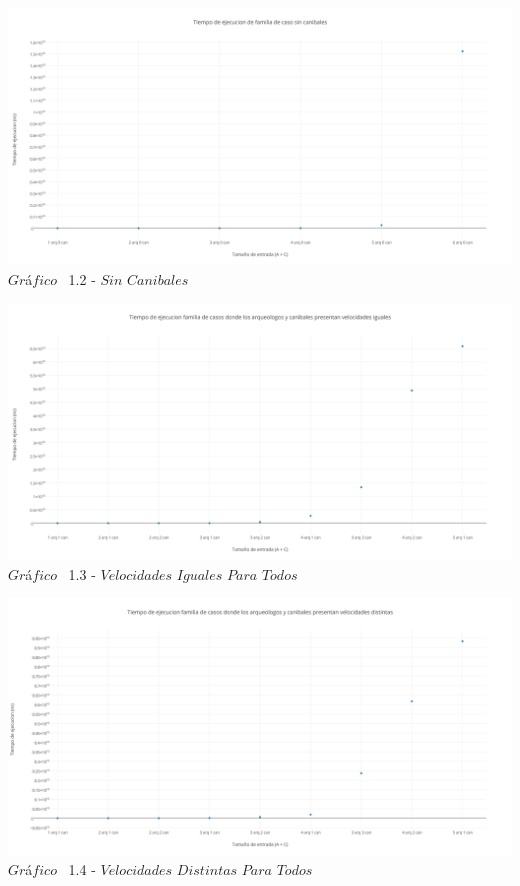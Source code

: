  \vspace*{0.3cm} \vspace*{0.3cm}
  \begin{center}
 \includegraphics[scale=0.45]{./EJ1/sincanibales.png}
 {$Gr$\'a$fico$ \ 1.2 - $Sin$ $Canibales$}
  \end{center}
  \vspace*{0.3cm}
  
     \vspace*{0.3cm} \vspace*{0.3cm}
  \begin{center}
 \includegraphics[scale=0.45]{./EJ1/velIgual.png}
 {$Gr$\'a$fico$ \ 1.3 - $Velocidades$ $Iguales$ $Para$ $Todos$}
  \end{center}
  \vspace*{0.3cm}
  
   \vspace*{0.3cm} \vspace*{0.3cm}
  \begin{center}
 \includegraphics[scale=0.45]{./EJ1/velDistinta.png}
 {$Gr$\'a$fico$ \ 1.4 - $Velocidades$ $Distintas$ $Para$ $Todos$}
  \end{center}
  \vspace*{0.3cm}
  
